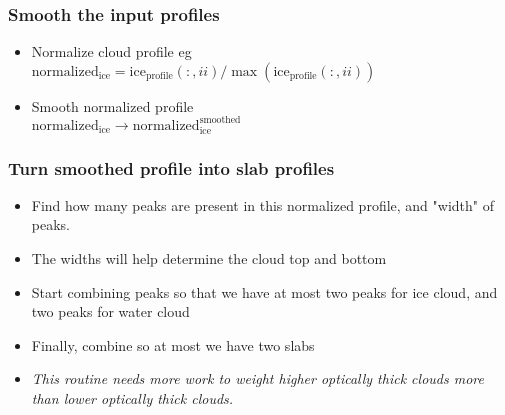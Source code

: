 \documentclass[11pt]{article}
\begin{document}
\subsubsection{Smooth the input profiles}
\begin{itemize}
\item Normalize cloud profile eg \\ \hspace{1in}
  $\text{normalized}_{\text{ice}} =
  \text{ice}_{\text{profile}}(:,ii)/\max(\text{ice}_{\text{profile}}(:,ii))$
\item Smooth normalized profile \\ \hspace{1in}
  $\text{normalized}_{\text{ice}} \rightarrow
  \text{normalized}_{\text{ice}}^{\text{smoothed}}$
\end{itemize}

\subsubsection{Turn smoothed profile into slab profiles}
\begin{itemize}
\item Find how many peaks are present in this normalized profile, and
  "width" of peaks.
\item The widths will help determine the cloud top and bottom
\item Start combining peaks so that we have at most two peaks for ice
  cloud, and two peaks for water cloud
\item Finally, combine so at most we have two slabs
\item \emph{This routine needs more work to weight higher optically
    thick clouds more than lower optically thick clouds.}
\end{itemize}
\end{document}

